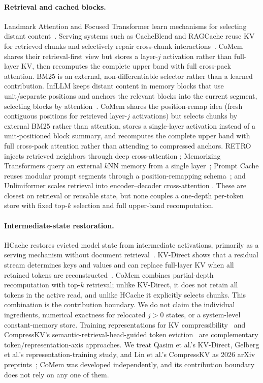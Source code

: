 \paragraph{Retrieval and cached blocks.}
Landmark Attention and Focused Transformer learn mechanisms for selecting
distant content~\citep{landmark,longllama}.  Serving systems such as CacheBlend
and RAGCache reuse KV for retrieved chunks and selectively repair cross-chunk
interactions~\citep{cacheblend,ragcache}.  CoMem shares their retrieval-first
view but stores a layer-$j$ activation rather than full-layer KV, then
recomputes the complete upper band with full cross-pack attention.  BM25 is an
external, non-differentiable selector rather than a learned contribution.
InfLLM keeps distant content in memory blocks that use unit/separate positions
and anchors the relevant blocks into the current segment, selecting blocks by
attention~\citep{infllm}.  CoMem shares the position-remap idea (fresh
contiguous positions for retrieved layer-$j$ activations) but selects chunks by
external BM25 rather than attention, stores a single-layer activation instead of
a unit-positioned block summary, and recomputes the complete upper band with
full cross-pack attention rather than attending to compressed anchors.
RETRO injects retrieved neighbors through deep cross-attention
\citep{retro}; Memorizing Transformers query an external $k$NN memory from a
single layer~\citep{memorizingtransformers}; Prompt Cache reuses modular prompt
segments through a position-remapping schema~\citep{promptcache}; and
Unlimiformer scales retrieval into encoder--decoder cross-attention
\citep{unlimiformer}.  These are closest on retrieval or reusable state, but
none couples a one-depth per-token store with fixed top-$k$ selection and full
upper-band recomputation.

\paragraph{Intermediate-state restoration.}
HCache restores evicted model state from intermediate activations, primarily as
a serving mechanism without document retrieval~\citep{hcache}.  KV-Direct shows
that a residual stream determines keys and values and can replace full-layer KV
when all retained tokens are reconstructed~\citep{kvdirect}.  CoMem combines
partial-depth recomputation with top-$k$ retrieval; unlike KV-Direct, it does
not retain all tokens in the active read, and unlike HCache it explicitly
selects chunks.  This combination is the contribution boundary.  We do not
claim the individual ingredients, numerical exactness for relocated $j>0$
states, or a system-level constant-memory store.  Training representations for
KV compressibility~\citep{kvcat} and CompressKV's semantic-retrieval-head-guided
token eviction~\citep{compresskv} are complementary token/representation-axis
approaches.  We treat Qasim et al.'s KV-Direct, Gelberg et al.'s
representation-training study, and Lin et al.'s CompressKV as 2026 arXiv
preprints~\citep{kvdirect,kvcat,compresskv}; CoMem was developed independently,
and its contribution boundary does not rely on any one of them.

